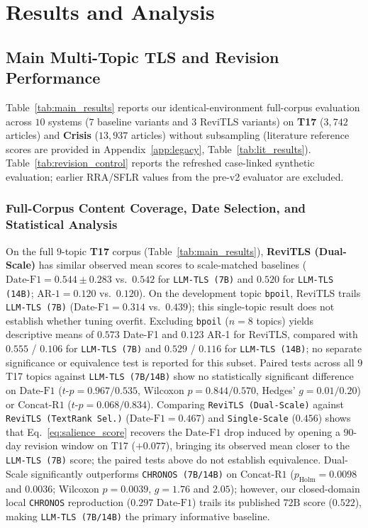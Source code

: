 \documentclass[journal]{IEEEtran}
\begin{document}
\section{Results and Analysis}
\label{sec:results}

\subsection{Main Multi-Topic TLS and Revision Performance}
\label{subsec:main_results}

Table~\ref{tab:main_results} reports our identical-environment full-corpus evaluation across $10$ systems ($7$ baseline variants and $3$ ReviTLS variants) on \textbf{T17} ($3{,}742$ articles) and \textbf{Crisis} ($13{,}937$ articles) without subsampling (literature reference scores are provided in Appendix~\ref{app:legacy}, Table~\ref{tab:lit_results}). Table~\ref{tab:revision_control} reports the refreshed case-linked synthetic evaluation; earlier RRA/SFLR values from the pre-v2 evaluator are excluded.

\subsubsection{Full-Corpus Content Coverage, Date Selection, and Statistical Analysis}
On the full $9$-topic \textbf{T17} corpus (Table~\ref{tab:main_results}), \textbf{ReviTLS (Dual-Scale)} has similar observed mean scores to scale-matched baselines ($\text{Date-F1} = 0.544 \pm 0.283$ vs.\ $0.542$ for \texttt{LLM-TLS (7B)} and $0.520$ for \texttt{LLM-TLS (14B)}; $\text{AR-1} = 0.120$ vs.\ $0.120$). On the development topic \texttt{bpoil}, ReviTLS trails \texttt{LLM-TLS (7B)} ($\text{Date-F1} = 0.314$ vs.\ $0.439$); this single-topic result does not establish whether tuning overfit. Excluding \texttt{bpoil} ($n=8$ topics) yields descriptive means of $0.573$ Date-F1 and $0.123$ AR-1 for ReviTLS, compared with $0.555$ / $0.106$ for \texttt{LLM-TLS (7B)} and $0.529$ / $0.116$ for \texttt{LLM-TLS (14B)}; no separate significance or equivalence test is reported for this subset. Paired tests across all $9$ T17 topics against \texttt{LLM-TLS (7B/14B)} show no statistically significant difference on $\text{Date-F1}$ ($t\text{-}p = 0.967 / 0.535$, Wilcoxon $p = 0.844 / 0.570$, Hedges' $g = 0.01 / 0.20$) or $\text{Concat-R1}$ ($t\text{-}p = 0.068 / 0.834$). Comparing \texttt{ReviTLS (Dual-Scale)} against \texttt{ReviTLS (TextRank Sel.)} ($\text{Date-F1} = 0.467$) and \texttt{Single-Scale} ($0.456$) shows that Eq.~\eqref{eq:salience_score} recovers the $\text{Date-F1}$ drop induced by opening a $90$-day revision window on T17 ($+0.077$), bringing its observed mean closer to the \texttt{LLM-TLS (7B)} score; the paired tests above do not establish equivalence. Dual-Scale significantly outperforms \texttt{CHRONOS (7B/14B)} on $\text{Concat-R1}$ ($p_{\text{Holm}} = 0.0098$ and $0.0036$; Wilcoxon $p = 0.0039$, $g = 1.76$ and $2.05$); however, our closed-domain local \texttt{CHRONOS} reproduction ($0.297$ $\text{Date-F1}$) trails its published $72\text{B}$ score ($0.522$), making \texttt{LLM-TLS (7B/14B)} the primary informative baseline.
\end{document}
